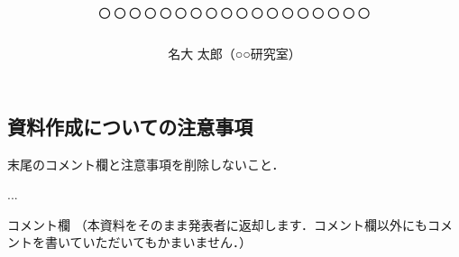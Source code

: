 \documentclass[a4j,10pt]{jarticle}
\title{○○○○○○○○○○○○○○○○○○}
\author{名大 太郎（○○研究室）}
\date{}
\begin{document}
\maketitle
\thispagestyle{empty}
\begin{multicols}{1}

\section{資料作成についての注意事項}

末尾のコメント欄と注意事項を削除しないこと．

\begin{thebibliography}{10}

 ...

\end{thebibliography}

\end{multicols}
\vfill
\noindent
{\gt コメント欄}
{\footnotesize
（本資料をそのまま発表者に返却します．コメント欄以外にもコメントを書いていただいてもかまいません．）}
\\
\fbox{\begin{minipage}{\textwidth}\noindent\\\\\end{minipage}}	
\end{document}
